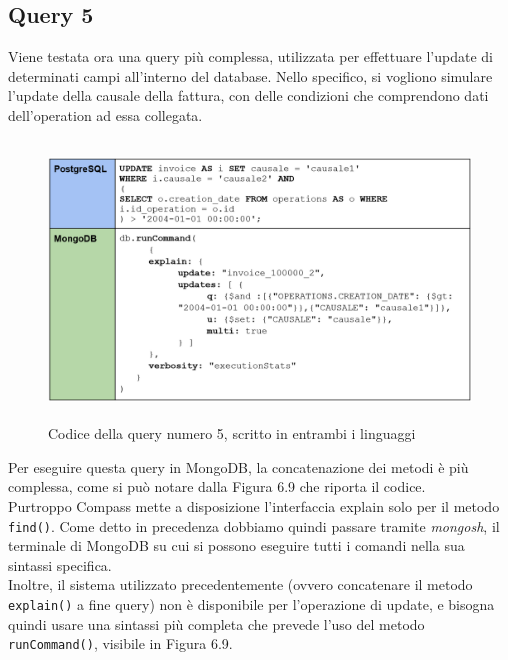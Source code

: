 
\subsection{Query 5}
Viene testata ora una query più complessa, utilizzata per effettuare l'update di determinati campi all'interno del database. Nello specifico, si vogliono simulare l'update della causale della fattura, con delle condizioni che comprendono dati dell'operation ad essa collegata.\\

\begin{figure}[htbp]
\begin{center}
\includegraphics[height=20em]{immagini/query/query5.png}
\caption{Codice della query numero 5, scritto in entrambi i linguaggi}
\end{center}
\end{figure}

\noindent Per eseguire questa query in MongoDB, la concatenazione dei metodi è più complessa, come si può notare dalla Figura 6.9 che riporta il codice.\\
Purtroppo Compass mette a disposizione l'interfaccia explain solo per il metodo \texttt{find()}. Come detto in precedenza dobbiamo quindi passare tramite \textit{mongosh}, il terminale di MongoDB su cui si possono eseguire tutti i comandi nella sua sintassi specifica.\\
Inoltre, il sistema utilizzato precedentemente (ovvero concatenare il metodo \texttt{explain()} a fine query) non è disponibile per l'operazione di update, e bisogna quindi usare una sintassi più completa che prevede l'uso del metodo \texttt{runCommand()}, visibile in Figura 6.9.\\

